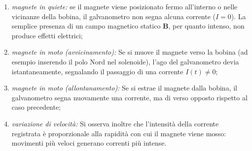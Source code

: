 \documentclass[a4paper,11pt]{report}
\begin{document}
\begin{enumerate}
    \item \textit{magnete in quiete:} se il magnete viene posizionato fermo all'interno o nelle vicinanze della bobina, il galvanometro non segna alcuna corrente ($I=0$). La semplice presenza di un campo magnetico statico $\bm{B}$, per quanto intenso, non produce effetti elettrici;
    
    \item \textit{magnete in moto (avvicinamento):} Se si muove il magnete verso la bobina (ad esempio inserendo il polo Nord nel solenoide), l'ago del galvanometro devia istantaneamente, segnalando il passaggio di una corrente $I(t) \neq 0$;
    
    \item \textit{magnete in moto (allontanamento):} Se si estrae il magnete dalla bobina, il galvanometro segna nuovamente una corrente, ma di verso opposto rispetto al caso precedente;
    
    \item \textit{variazione di velocità:} Si osserva inoltre che l'intensità della corrente registrata è proporzionale alla rapidità con cui il magnete viene mosso: movimenti più veloci generano correnti più intense.
\end{enumerate}
\end{document}
